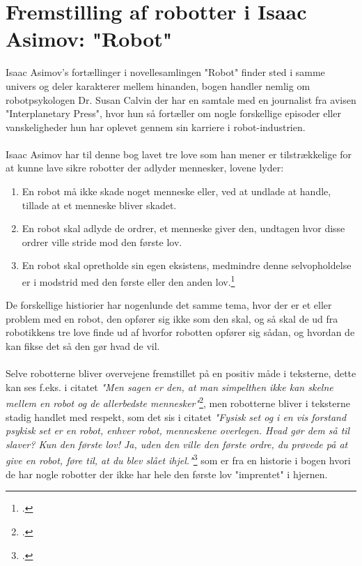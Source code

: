 \section{Fremstilling af robotter i Isaac Asimov: "Robot"}
Isaac Asimov's fortællinger i novellesamlingen "Robot" finder sted i samme univers og deler karakterer mellem hinanden, bogen handler nemlig om
robotpsykologen Dr. Susan Calvin der har en samtale med en journalist fra avisen "Interplanetary Press", hvor hun så fortæller om nogle forskellige episoder eller
vanskeligheder hun har oplevet gennem sin karriere i robot-industrien.
\\
\\
Isaac Asimov har til denne bog lavet tre love som han mener er tilstrækkelige for at kunne lave sikre robotter der adlyder mennesker, lovene lyder:
\begin{enumerate}
\item[1.] En robot må ikke skade noget menneske eller, ved at undlade at handle, tillade at et menneske bliver skadet.
\item[2.] En robot skal adlyde de ordrer, et menneske giver den, undtagen hvor disse ordrer ville stride mod den første lov.
\item[3.] En robot skal opretholde sin egen eksistens, medmindre denne selvopholdelse er i modstrid med den første eller den anden lov.\footcite[7]{robot}
\end{enumerate}

De forskellige histiorier har nogenlunde det samme tema, hvor der er et eller problem med en robot, den opfører sig ikke som den skal, og så skal de ud fra
robotikkens tre love finde ud af hvorfor robotten opfører sig sådan, og hvordan de kan fikse det så den gør hvad de vil.
\\
\\
Selve robotterne bliver overvejene fremstillet på en positiv måde i teksterne, dette kan ses f.eks. i citatet \textit{"Men sagen er den, at man simpelthen
ikke kan skelne mellem en robot og de allerbedste mennesker"}\footcite[194, l. 5]{robot}, men robotterne bliver i teksterne stadig handlet med respekt,
som det sis i citatet \textit{"Fysisk set og i en vis forstand psykisk set er en robot, enhver robot, menneskene overlegen. Hvad gør dem så til slaver?
Kun den første lov! Ja, uden den ville den første ordre, du prøvede på at give en robot, føre til, at du blev slået ihjel."}\footcite[130, l. 31]{robot} som
er fra en historie i bogen hvori de har nogle robotter der ikke har hele den første lov "imprentet" i hjernen.

